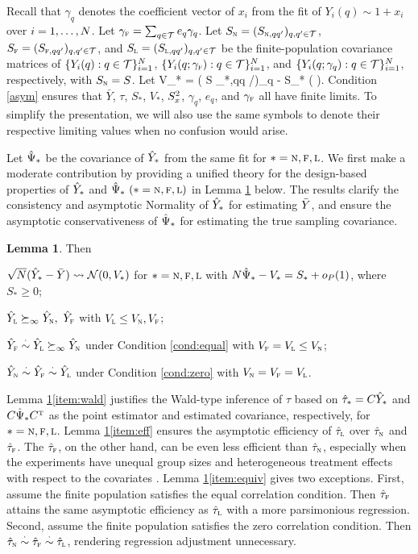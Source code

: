 \documentclass[11pt]{article}
\theoremstyle{definition}
\newtheorem{lemma}{Lemma}
\begin{document}
Recall that $\gamma_q$ denotes the coefficient vector of $x_i$ from the  {\ols} fit of $Y_i(q)\sim 1+ x_i$  over $i = 1, \ldots,N$.  
Let $\gamma_{\textsc{f}} = \sum_{q \in\mathcal{T}} e_q \gamma_q$. Let $S_{\textsc{n}} = (S_{\textsc{n},qq'})_{q,q'\in\mathcal{T}}$, $S_{\textsc{f}} = (S_{\textsc{f},qq'})_{q,q'\in\mathcal{T}}$, and  $S_{\textsc{l}} = (S_{\textsc{l},qq'})_{q,q'\in\mathcal{T}}$ be the finite-population covariance matrices of $\{Y_i(q): q\in \mathcal{T}\}_{i=1}^N$, $\{Y_i(q;\gamma_{\textsc{f}}): q\in \mathcal{T}\}_{i=1}^N$, and $\{Y_i(q;\gamma_q): q\in \mathcal{T}\}_{i=1}^N$, respectively, with $S_{\textsc{n}} = S$. 
Let 
\begina
V_* =  \diag( S _{*,qq} /\pq )_{q\in\mt} -  S_* \qquad ( \nfl).
\enda  
%
Condition \ref{asym} ensures that 
$\bar{Y}$,  $\tau$, $S_*$, $V_*$, $S^2_{x}$, $\gamma_q$, $e_q$,  and $\gamma_{\textsc{f}}$  all have finite limits. 
To simplify the presentation, we will also use the same symbols  to denote their respective limiting values when no confusion would arise. 



Let $\hat\Psi_*$ be the \ehws covariance of $\hat Y_*$  from the same \olss fit for $* =\textsc{n}, \textsc{f}, \textsc{l}$. We first make a moderate contribution by providing a unified theory for the design-based properties of $\hat Y_*$ and $\hat\Psi_* \ (* =\textsc{n}, \textsc{f}, \textsc{l})$  in Lemma \ref{lem:reg} below.  The results clarify the consistency and asymptotic Normality of $\hat Y_*$ for estimating $\bar Y$, and ensure the asymptotic conservativeness of $\hat\Psi_*$ for estimating the true sampling covariance. 

\begin{lemma}\label{lem:reg}
{\precre} 
Then 
\begine[(i)]
\item\label{item:wald} $\sqrt N (\hat Y_* -\bar{ Y}) \rightsquigarrow \mathcal{N}(  0, V_*)$ for $* =\textsc{n}, \textsc{f}, \textsc{l}$ with $N \hat\Psi_* - V_* =  S_* + o_P(1)$, where $S_* \geq 0$; 
\item\label{item:eff}  $\hat Y_{\textsc{l}} \succeq_\infty \hat Y_{\textsc{n}}, \ \hat Y_{\textsc{f}}$ with $V_{\textsc{l}} \leq V_{\textsc{n}}, V_{\textsc{f}}$; 
\item\label{item:equiv} $\hat Y_{\textsc{f}} \overset{\cdot}{\sim} \hat Y_{\textsc{l}} \succeq_\infty \hat Y_{\textsc{n}}$ under Condition \ref{cond:equal} with $V_{\textsc{f}} = V_{\textsc{l}} \leq V_{\textsc{n}}$; 
\item[{\color{white}(iii)}]$\hat Y_{\textsc{n}} \overset{\cdot}{\sim} \hat Y_{\textsc{f}} \overset{\cdot}{\sim} \hat Y_{\textsc{l}}$  under Condition \ref{cond:zero} with $V_{\textsc{n}} = V_{\textsc{f}} = V_{\textsc{l}}$. 
\ende
\end{lemma}

Lemma \ref{lem:reg}\eqref{item:wald}  justifies the Wald-type inference of $\tau$ based on $\hat\tau_* = C\hat Y_*$ and  $ C \hat \Psi_* C^{ \mathrm{\scriptscriptstyle T} }$ as the point estimator and estimated covariance, respectively, for $* = \textsc{n}, \textsc{f},\textsc{l}$.
Lemma \ref{lem:reg}\eqref{item:eff} ensures the asymptotic efficiency of $\hat\tau_{\textsc{l}}$ over $\hat\tau_{\textsc{n}}$ and $\hat\tau_{\textsc{f}}$. %
The $\hat\tau_{\textsc{f}}$, on the other hand, can be even less efficient than $\hat\tau_{\textsc{n}}$, especially when the experiments have unequal group sizes and heterogeneous treatment effects with respect to the covariates \citep{Freedman08a}. 
Lemma \ref{lem:reg}\eqref{item:equiv} gives two exceptions.
First,  assume the finite population satisfies the equal correlation condition. Then $\hat\tau_{\textsc{f}}$ attains the same asymptotic efficiency as $\hat\tau_{\textsc{l}}$ with a more parsimonious regression. 
Second,  assume the finite population satisfies the zero correlation condition. Then $\hat\tau_{\textsc{n}} \overset{\cdot}{\sim} \hat\tau_{\textsc{f}} \overset{\cdot}{\sim} \hat\tau_{\textsc{l}}$, rendering regression adjustment unnecessary.
\end{document}
